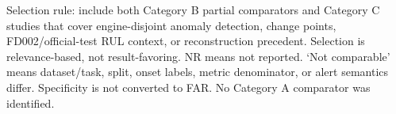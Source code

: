 \begin{table}[t]
\begin{tabular}{p{}p{}p{}p{}p{}p{}p{}p{}p{}}
\hline
\end{tabular}
\vspace{0.5ex}
\parbox{0.98\textwidth}{\footnotesize Selection rule: include both Category B partial comparators and Category C studies that cover engine-disjoint anomaly detection, change points, FD002/official-test RUL context, or reconstruction precedent. Selection is relevance-based, not result-favoring. NR means not reported. ‘Not comparable’ means dataset/task, split, onset labels, metric denominator, or alert semantics differ. Specificity is not converted to FAR. No Category A comparator was identified.}
\end{table}
